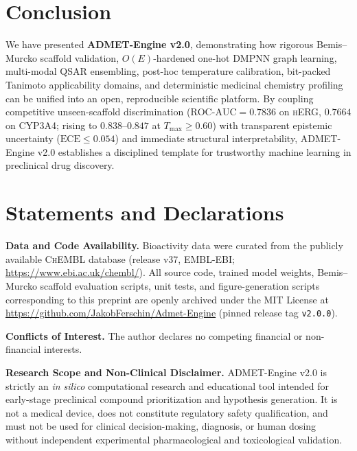 \documentclass[10pt,twocolumn,letterpaper]{article}
\newcommand{\Tmax}{T_{\max}}
\begin{document}
\section{Conclusion}
We have presented \textbf{ADMET-Engine v2.0}, demonstrating how rigorous Bemis–Murcko scaffold validation, $O(E)$-hardened one-hot \textsc{DMPNN} graph learning, multi-modal \textsc{QSAR} ensembling, post-hoc temperature calibration, bit-packed Tanimoto applicability domains, and deterministic medicinal chemistry profiling can be unified into an open, reproducible scientific platform. By coupling competitive unseen-scaffold discrimination ($\mathrm{ROC\text{-}AUC} = 0.7836$ on \textsc{hERG}, $0.7664$ on \textsc{CYP3A4}; rising to $0.838$–$0.847$ at $\Tmax \ge 0.60$) with transparent epistemic uncertainty ($\mathrm{ECE} \le 0.054$) and immediate structural interpretability, ADMET-Engine v2.0 establishes a disciplined template for trustworthy machine learning in preclinical drug discovery.

\section*{Statements and Declarations}
\noindent\textbf{Data and Code Availability.}
Bioactivity data were curated from the publicly available \textsc{ChEMBL} database (release v37, EMBL-EBI; \url{https://www.ebi.ac.uk/chembl/}). All source code, trained model weights, Bemis–Murcko scaffold evaluation scripts, unit tests, and figure-generation scripts corresponding to this preprint are openly archived under the MIT License at \url{https://github.com/JakobFerschin/Admet-Engine} (pinned release tag \texttt{v2.0.0}).

\medskip
\noindent\textbf{Conflicts of Interest.}
The author declares no competing financial or non-financial interests.

\medskip
\noindent\textbf{Research Scope and Non-Clinical Disclaimer.}
ADMET-Engine v2.0 is strictly an \textit{in silico} computational research and educational tool intended for early-stage preclinical compound prioritization and hypothesis generation. It is not a medical device, does not constitute regulatory safety qualification, and must not be used for clinical decision-making, diagnosis, or human dosing without independent experimental pharmacological and toxicological validation.



\end{document}
